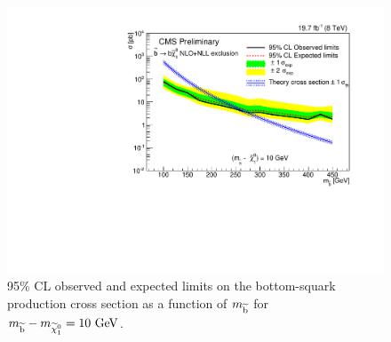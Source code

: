 \begin{figure}[!Hhtb]
  \begin{center}
  \includegraphics[scale=0.39]{Figures/sus13009/limitplots/plots/sbottom/Limit_susy_sbottom_10.pdf}
  \caption{95\% \ac{CL} observed and expected limits on the bottom-squark production cross section as a function of $m_{\widetilde{{\rm b}}}$ for $m_{\widetilde{{\rm b}}} - m_{\widetilde{\chi}^{0}_{1}} = 10~\mathrm{GeV}$.}
  \label{fig:sbottom_10GeV}
  \end{center}
\end{figure}

